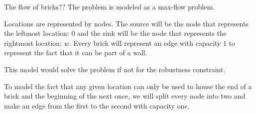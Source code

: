 \documentclass{writeup}
\begin{document}
\begin{solutions}
  \begin{solution}{The flow of bricks}{?}{?}
    The problem is modeled as a max-flow problem.

    Locations are represented by nodes.
    The source will be the node that represents the leftmost location: $0$ and the sink will be the node that represents the rightmost location: $w$.
    Every brick will represent an edge with capacity $1$ to represent the fact that it can be part of a wall.

    This model would solve the problem if not for the robustness constraint.

    To model the fact that any given location can only be used to house the end of a brick and the beginning of the next once, we will split every node into two and make an edge from the first to the second with capacity one.
  \end{solution}
\end{solutions}
\end{document}
